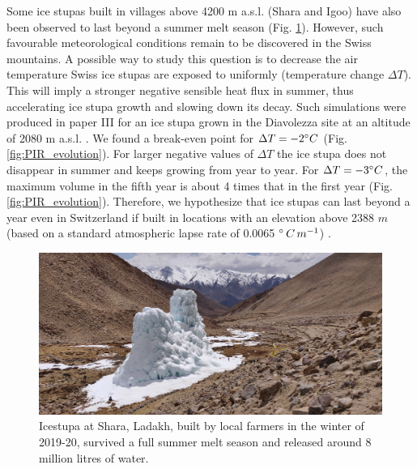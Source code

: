 Some ice stupas built in villages above 4200 m \ac{a.s.l.} (Shara and Igoo) have also been observed to last
beyond a summer melt season (Fig. \ref{fig:PIR}). However, such favourable meteorological conditions remain to
be discovered in the Swiss mountains. A possible way to study this question is to decrease the air temperature
Swiss ice stupas are exposed to uniformly (temperature change $\Delta T$). This will imply a stronger negative
sensible heat flux in summer, thus accelerating ice stupa growth and slowing down its decay. Such simulations
were produced in paper III for an ice stupa grown in the Diavolezza site at an altitude of 2080 m \ac{a.s.l.} .
We found a break-even point for $\Delta T = -2 ^{\circ} C$ (Fig. \ref{fig:PIR_evolution}). For larger negative
values of $\Delta T$ the ice stupa does not disappear in summer and keeps growing from year to year. For $\Delta
	T = -3 ^{\circ} C$, the maximum volume in the fifth year is about 4 times that in the first year (Fig.
\ref{fig:PIR_evolution}). Therefore, we hypothesize that ice stupas can last beyond a year even in Switzerland
if built in locations with an elevation above 2388 $m$ (based on a standard atmospheric lapse rate of 0.0065
$^{\circ}\,C\,m^{-1}$) .

\begin{figure}[htb]
	\centering
	\includegraphics[width=\textwidth]{figs/PIR_example.jpg}

	\caption{Icestupa at Shara, Ladakh, built by local farmers in the winter of 2019-20, survived a full summer melt season and released
		around 8 million litres of water.}

	\label{fig:PIR}
\end{figure}

